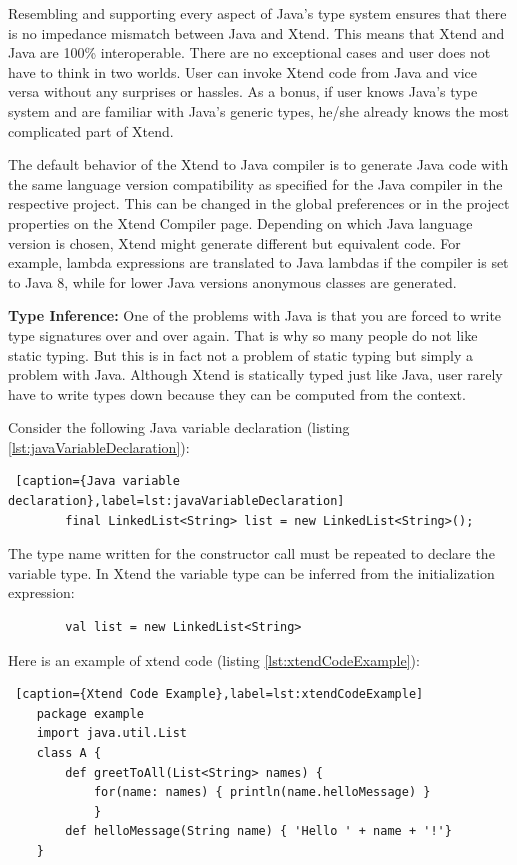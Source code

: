 	Resembling and supporting every aspect of Java's type system ensures that there is no impedance mismatch between Java and Xtend. This means that Xtend and Java are 100\% interoperable. There are no exceptional cases and user does not have to think in two worlds. User can invoke Xtend code from Java and vice versa without any surprises or hassles. As a bonus, if user knows Java's type system and are familiar with Java's generic types, he/she already knows the most complicated part of Xtend.
	
	The default behavior of the Xtend to Java compiler is to generate Java code with the same language version compatibility as specified for the Java compiler in the respective project. This can be changed in the global preferences or in the project properties on the Xtend  Compiler page. Depending on which Java language version is chosen, Xtend might generate different but equivalent code. For example, lambda expressions are translated to Java lambdas if the compiler is set to Java 8, while for lower Java versions anonymous classes are generated.
	
	\textbf{Type Inference:}
	One of the problems with Java is that you are forced to write type signatures over and over again. That is why so many people do not like static typing. But this is in fact not a problem of static typing but simply a problem with Java. Although Xtend is statically typed just like Java, user rarely have to write types down because they can be computed from the context.
	
	Consider the following Java variable declaration (listing \ref{lst:javaVariableDeclaration}):
	\begin{lstlisting} [caption={Java variable declaration},label=lst:javaVariableDeclaration]
		final LinkedList<String> list = new LinkedList<String>();
	\end{lstlisting}
	The type name written for the constructor call must be repeated to declare the variable type. In Xtend the variable type can be inferred from the initialization expression:
	\begin{lstlisting}
		val list = new LinkedList<String>
	\end{lstlisting}		
	Here is an example of xtend code (listing \ref{lst:xtendCodeExample}):
	\begin{lstlisting} [caption={Xtend Code Example},label=lst:xtendCodeExample]
	package example	
	import java.util.List		
	class A {
		def greetToAll(List<String> names) {
			for(name: names) { println(name.helloMessage) }
			}		
		def helloMessage(String name) { 'Hello ' + name + '!'}
	}
	
	\end{lstlisting} 
	   
